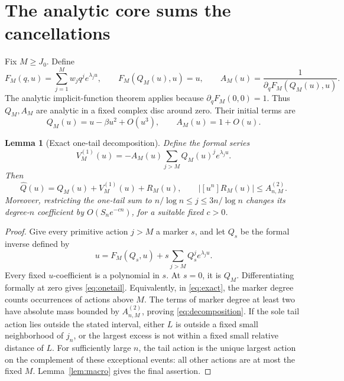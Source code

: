 \documentclass[11pt,a4paper]{article}
\numberwithin{equation}{section}
\newtheorem{lemma}[theorem]{Lemma}
\theoremstyle{definition}\newtheorem{definition}[theorem]{Definition}
\theoremstyle{remark}\newtheorem{remark}[theorem]{Remark}
\theoremstyle{definition}
\newcommand{\Q}{\widehat Q}
\begin{document}
\section{The analytic core sums the cancellations}
\label{sec:core}

Fix \(M\ge J_0\). Define
\begin{equation}
 F_M(q,u)=\sum_{j=1}^M w_jq^j e^{\lambda_j u},\qquad
 F_M(Q_M(u),u)=u,
 \qquad A_M(u)=\frac1{\partial_qF_M(Q_M(u),u)}.
 \label{eq:core}
\end{equation}
The analytic implicit-function theorem applies because
\(\partial_qF_M(0,0)=1\). Thus \(Q_M,A_M\) are analytic in a fixed
complex disc around zero. Their initial terms are
\begin{equation}
 Q_M(u)=u-\beta u^2+O(u^3),\qquad A_M(u)=1+O(u).
 \label{eq:corejets}
\end{equation}

\begin{lemma}[Exact one-tail decomposition]
\label{lem:decomposition}
Define the formal series
\begin{equation}
 V_M^{(1)}(u)=-A_M(u)\sum_{j>M}Q_M(u)^j e^{\lambda_j u}.
 \label{eq:onetail}
\end{equation}
Then
\begin{equation}
 \Q(u)=Q_M(u)+V_M^{(1)}(u)+R_M(u),
 \qquad |[u^n]R_M(u)|\le A_{n,M}^{(2)}.
 \label{eq:decomposition}
\end{equation}
Moreover, restricting the one-tail sum to
\(n/\log n\le j\le3n/\log n\) changes its degree-\(n\) coefficient by
\(O(S_ne^{-cn})\), for a suitable fixed \(c>0\).
\end{lemma}
\begin{proof}
Give every primitive action \(j>M\) a marker \(s\), and let \(Q_s\) be the
formal inverse defined by
\[
 u=F_M(Q_s,u)+s\sum_{j>M}Q_s^j e^{\lambda_j u}.
\]
Every fixed \(u\)-coefficient is a polynomial in \(s\). At \(s=0\), it is
\(Q_M\). Differentiating formally at zero gives \eqref{eq:onetail}.
Equivalently, in \eqref{eq:exact}, the marker degree counts occurrences of
actions above \(M\). The terms of marker degree at least two have absolute
mass bounded by \(A_{n,M}^{(2)}\), proving \eqref{eq:decomposition}.
If the sole tail action lies outside the stated interval, either \(L\) is
outside a fixed small neighborhood of \(j_n\), or the largest excess is
not within a fixed small relative distance of \(L\). For sufficiently large
\(n\), the tail action is the unique largest action on the complement of
these exceptional events: all other actions are at most the fixed \(M\).
Lemma~\ref{lem:macro} gives the final assertion.
\end{proof}
\end{document}
